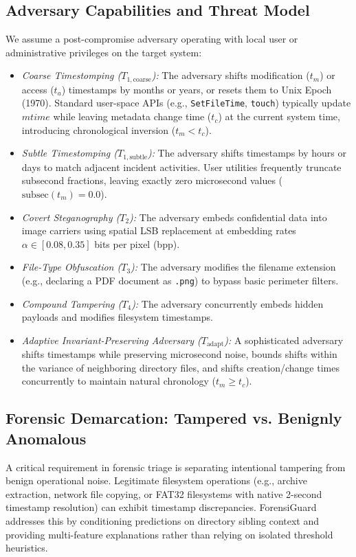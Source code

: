 \documentclass[conference]{IEEEtran}
\begin{document}
\subsection{Adversary Capabilities and Threat Model}
We assume a post-compromise adversary operating with local user or administrative privileges on the target system:
\begin{itemize}
    \item \textit{Coarse Timestomping ($T_{1,\text{coarse}}$):} The adversary shifts modification ($t_m$) or access ($t_a$) timestamps by months or years, or resets them to Unix Epoch (1970). Standard user-space APIs (e.g., \texttt{SetFileTime}, \texttt{touch}) typically update $mtime$ while leaving metadata change time ($t_c$) at the current system time, introducing chronological inversion ($t_m < t_c$).
    \item \textit{Subtle Timestomping ($T_{1,\text{subtle}}$):} The adversary shifts timestamps by hours or days to match adjacent incident activities. User utilities frequently truncate subsecond fractions, leaving exactly zero microsecond values ($\text{subsec}(t_m) = 0.0$).
    \item \textit{Covert Steganography ($T_2$):} The adversary embeds confidential data into image carriers using spatial LSB replacement at embedding rates $\alpha \in [0.08, 0.35]$ bits per pixel (bpp).
    \item \textit{File-Type Obfuscation ($T_3$):} The adversary modifies the filename extension (e.g., declaring a PDF document as \texttt{.png}) to bypass basic perimeter filters.
    \item \textit{Compound Tampering ($T_4$):} The adversary concurrently embeds hidden payloads and modifies filesystem timestamps.
    \item \textit{Adaptive Invariant-Preserving Adversary ($T_{\text{adapt}}$):} A sophisticated adversary shifts timestamps while preserving microsecond noise, bounds shifts within the variance of neighboring directory files, and shifts creation/change times concurrently to maintain natural chronology ($t_m \ge t_c$).
\end{itemize}

\subsection{Forensic Demarcation: Tampered vs. Benignly Anomalous}
A critical requirement in forensic triage is separating intentional tampering from benign operational noise. Legitimate filesystem operations (e.g., archive extraction, network file copying, or FAT32 filesystems with native 2-second timestamp resolution) can exhibit timestamp discrepancies. ForensiGuard addresses this by conditioning predictions on directory sibling context and providing multi-feature explanations rather than relying on isolated threshold heuristics.
\end{document}
